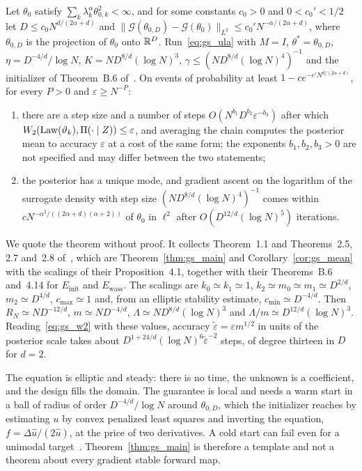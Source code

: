 \begin{theorem}\label{thm:gs_schr}
Let $\theta_0$ satisfy $\sum_k\lambda_k^\alpha\theta_{0,k}^2<\infty$, and for some constants $c_0>0$ and $0<c_0'<1/2$ let $D\le c_0N^{d/(2\alpha+d)}$ and $\|\mathcal{G}(\theta_{0,D})-\mathcal{G}(\theta_0)\|_{L^2}\le c_0'N^{-\alpha/(2\alpha+d)}$, where $\theta_{0,D}$ is the projection of $\theta_0$ onto $\mathbb{R}^D$. Run~\eqref{eq:gs_ula} with $M=I$, $\theta^*=\theta_{0,D}$, $\eta=D^{-4/d}/\log N$, $K=ND^{8/d}(\log N)^3$, $\gamma\le(ND^{8/d}(\log N)^4)^{-1}$ and the initializer of Theorem~B.6 of~\cite{nicklwang2024}. On events of probability at least $1-ce^{-c'N^{d/(2\alpha+d)}}$, for every $P>0$ and $\varepsilon\ge N^{-P}$:
\begin{enumerate}[label=(\roman*),nosep]
\item there are a step size and a number of steps $O(N^{b_1}D^{b_2}\varepsilon^{-b_3})$ after which $W_2(\operatorname{Law}(\vartheta_k),\Pi(\cdot\mid Z))\le\varepsilon$, and averaging the chain computes the posterior mean to accuracy $\varepsilon$ at a cost of the same form; the exponents $b_1,b_2,b_3>0$ are not specified and may differ between the two statements;
\item the posterior has a unique mode, and gradient ascent on the logarithm of the surrogate density with step size $(ND^{8/d}(\log N)^4)^{-1}$ comes within $cN^{-\alpha^2/((2\alpha+d)(\alpha+2))}$ of $\theta_0$ in $\ell^2$ after $O(D^{12/d}(\log N)^5)$ iterations.
\end{enumerate}
\end{theorem}

We quote the theorem without proof. It collects Theorem~1.1 and Theorems~2.5, 2.7 and~2.8 of~\cite{nicklwang2024}, which are Theorem~\ref{thm:gs_main} and Corollary~\ref{cor:gs_mean} with the scalings of their Proposition~4.1, together with their Theorems~B.6 and~4.14 for $E_{\mathrm{init}}$ and $E_{\mathrm{wass}}$. The scalings are $k_0\simeq k_1\simeq1$, $k_2\simeq m_0\simeq m_1\simeq D^{2/d}$, $m_2\simeq D^{4/d}$, $c_{\max}\simeq1$ and, from an elliptic stability estimate, $c_{\min}\simeq D^{-4/d}$. Then $R_N\simeq ND^{-12/d}$, $m\simeq ND^{-4/d}$, $\Lambda\simeq ND^{8/d}(\log N)^3$ and $\Lambda/m\simeq D^{12/d}(\log N)^3$. Reading~\eqref{eq:gs_w2} with these values, accuracy $\tilde\varepsilon=\varepsilon m^{1/2}$ in units of the posterior scale takes about $D^{1+24/d}(\log N)^6\tilde\varepsilon^{-2}$ steps, of degree thirteen in $D$ for $d=2$.

\begin{remark}\label{rem:gs_scope}
The equation is elliptic and steady: there is no time, the unknown is a coefficient, and the design fills the domain. The guarantee is local and needs a warm start in a ball of radius of order $D^{-4/d}/\log N$ around $\theta_{0,D}$, which the initializer reaches by estimating $u$ by convex penalized least squares and inverting the equation, $f=\Delta\hat u/(2\hat u)$, at the price of two derivatives. A cold start can fail even for a unimodal target~\cite{bandeira2023}. Theorem~\ref{thm:gs_main} is therefore a template and not a theorem about every gradient stable forward map.
\end{remark}

